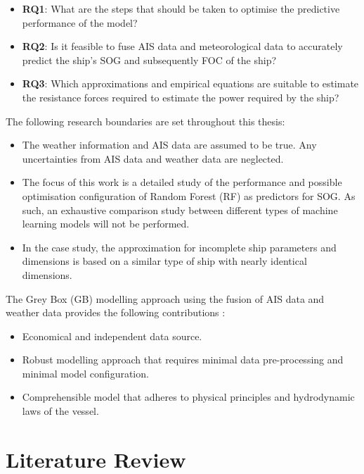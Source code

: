 \documentclass[]{interact}
\theoremstyle{plain}%
\theoremstyle{definition}
\theoremstyle{remark}
\begin{document}
\begin{itemize}
    \item \textbf{RQ1}: What are the steps that should be taken to optimise the predictive performance of the model?
    \item \textbf{RQ2}: Is it feasible to fuse AIS data and meteorological data to accurately predict the ship's SOG and subsequently FOC of the ship?
    \item \textbf{RQ3}: Which approximations and empirical equations are suitable to estimate the resistance forces required to estimate the power required by the ship? 
\end{itemize} 

The following research boundaries are set throughout this thesis:

\begin{itemize}
    \item The weather information and AIS data are assumed to be true. Any uncertainties from AIS data and weather data are neglected. 
    \item The focus of this work is a detailed study of the performance and possible optimisation configuration of Random Forest (RF) as predictors for SOG. As such, an exhaustive comparison study between different types of machine learning models will not be performed.
    \item In the case study, the approximation for incomplete ship parameters and dimensions is based on a similar type of ship with nearly identical dimensions. 
\end{itemize}

The Grey Box (GB) modelling approach using the fusion of AIS data and weather data provides the following contributions : 

\begin{itemize}
    \item Economical and independent data source.
    \item Robust modelling approach that requires minimal data pre-processing and minimal model configuration.
    \item Comprehensible model that adheres to physical principles and hydrodynamic laws of the vessel.  
\end{itemize} 


\section{Literature Review}\label{sec:literature_review}
\end{document}

